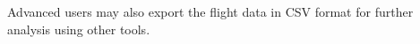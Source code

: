 Advanced users may also export the flight data in CSV format for
further analysis using other tools.

%
%
%
%
%
%
%
%
